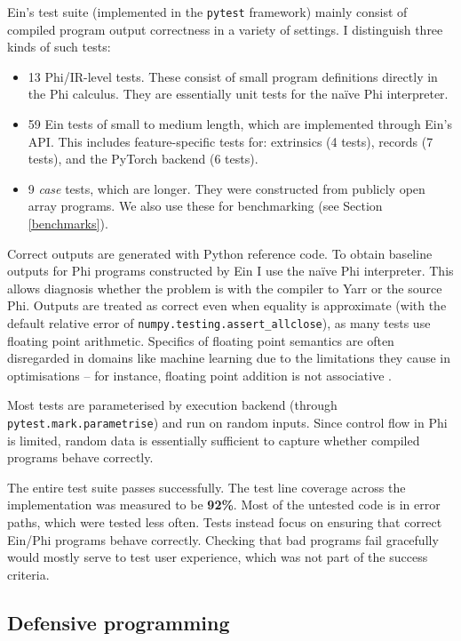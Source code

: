 Ein's test suite (implemented in the \texttt{pytest} framework) mainly consist of compiled program output correctness in a variety of settings. 
I distinguish three kinds of such tests:
\begin{itemize}
    \item 13 Phi/IR-level tests. These consist of small program definitions directly in the Phi calculus. They are essentially unit tests for the na\"ive Phi interpreter.
    \item 59 Ein tests of small to medium length, which are implemented through Ein's API. This includes feature-specific tests for: extrinsics (4 tests), records (7 tests), and the PyTorch backend (6 tests).
    \item 9 \textit{case} tests, which are longer. They were constructed from publicly open array programs. We also use these for benchmarking (see Section \ref{benchmarks}).
\end{itemize}

Correct outputs are generated with Python reference code.
To obtain baseline outputs for Phi programs constructed by Ein I use the na\"ive Phi interpreter.
This allows diagnosis whether the problem is with the compiler to Yarr or the source Phi.
Outputs are treated as correct even when equality is approximate (with the default relative error of \texttt{numpy.testing.assert\_allclose}), as many tests use floating point arithmetic. 
Specifics of floating point semantics are often disregarded in domains like machine learning due to the limitations they cause in optimisations -- for instance, floating point addition is not associative \cite{alawi2004every}.

Most tests are parameterised by execution backend (through \texttt{pytest.mark.parametrise}) and run on random inputs. Since control flow in Phi is limited, random data is essentially sufficient to capture whether compiled programs behave correctly. 

The entire test suite passes successfully. The test line coverage across the implementation was measured to be \textbf{92\%}. Most of the untested code is in error paths, which were tested less often. Tests instead focus on ensuring that correct Ein/Phi programs behave correctly.
Checking that bad programs fail gracefully would mostly serve to test user experience, which was not part of the success criteria.

\subsection{Defensive programming}

